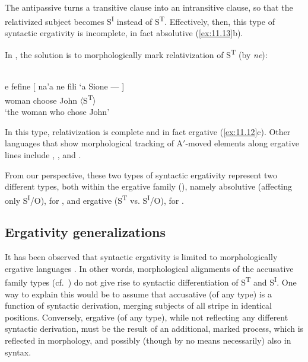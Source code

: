 \documentclass[output=paper]{langsci/langscibook}
\begin{document}
The antipassive turns a transitive clause into an intransitive clause, so that
the relativized subject becomes S\textsuperscript{I} instead of
S\textsuperscript{T}. Effectively, then, this type of syntactic ergativity is
incomplete, in fact absolutive (\ref{ex:11.13}b).

In , the solution is to morphologically mark relativization of
S\textsuperscript{T} (by \emph{ne}):

\ea%
    \label{ex:11.22} {\parencite[81]{Otsuka2006}}\\
    \gll e    fefine  [  na'a  ne  fili      ‘a    Sione  —    ]\\
        \Def{}  woman {}   \Pst{}  \Tsg{}  choose    \Abs{}  John  〈S\textsuperscript{T}〉\\
    \glt ‘the woman who chose John’
    \z

In this type, relativization is complete and in fact ergative
(\ref{ex:11.12}c). Other languages that show morphological tracking of
A$'$-moved elements along ergative lines include , ,
and  \citep[180--181]{Deal2016}.

From our perspective, these two types of syntactic ergativity represent two
different  types, both within the ergative family (), namely
absolutive (affecting only S\textsuperscript{I}/O), for , and
ergative (S\textsuperscript{T} vs. S\textsuperscript{I}/O), for .

\subsection{Ergativity generalizations}\label{sec:11.5.6}

It has been observed that syntactic ergativity is limited to
morphologically ergative languages
\citep[172]{Dixon1994}. In other words, morphological alignments of the
accusative family types (cf.\ ) do not give rise to
syntactic differentiation of S\textsuperscript{T} and S\textsuperscript{I}. One
way to explain this would be to assume that accusative  (of any
type) is a function of syntactic derivation, merging subjects of all stripe in
identical positions. Conversely, ergative  (of any type), while
not reflecting any different syntactic derivation, must be the result of an
additional, marked process, which is reflected in morphology, and possibly
(though by no means necessarily) also in syntax.
\end{document}
